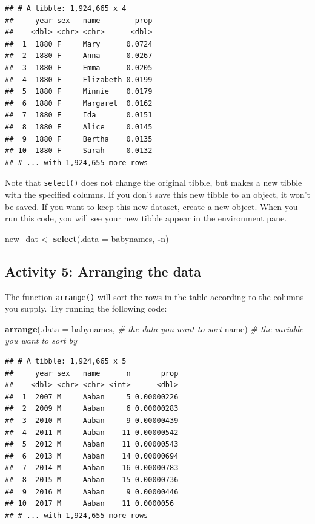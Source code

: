 \documentclass[]{book}
\newenvironment{Shaded}{\begin{snugshade}}{\end{snugshade}}
\newcommand{\CommentTok}[1]{\textcolor[rgb]{0.56,0.35,0.01}{\textit{#1}}}
\newcommand{\DataTypeTok}[1]{\textcolor[rgb]{0.13,0.29,0.53}{#1}}
\newcommand{\KeywordTok}[1]{\textcolor[rgb]{0.13,0.29,0.53}{\textbf{#1}}}
\newcommand{\NormalTok}[1]{#1}
\newcommand{\OperatorTok}[1]{\textcolor[rgb]{0.81,0.36,0.00}{\textbf{#1}}}
\newcommand{\StringTok}[1]{\textcolor[rgb]{0.31,0.60,0.02}{#1}}
\begin{document}
\begin{verbatim}
## # A tibble: 1,924,665 x 4
##     year sex   name        prop
##    <dbl> <chr> <chr>      <dbl>
##  1  1880 F     Mary      0.0724
##  2  1880 F     Anna      0.0267
##  3  1880 F     Emma      0.0205
##  4  1880 F     Elizabeth 0.0199
##  5  1880 F     Minnie    0.0179
##  6  1880 F     Margaret  0.0162
##  7  1880 F     Ida       0.0151
##  8  1880 F     Alice     0.0145
##  9  1880 F     Bertha    0.0135
## 10  1880 F     Sarah     0.0132
## # ... with 1,924,655 more rows
\end{verbatim}

Note that \texttt{select()} does not change the original tibble, but makes a new tibble with the specified columns. If you don't save this new tibble to an object, it won't be saved. If you want to keep this new dataset, create a new object. When you run this code, you will see your new tibble appear in the environment pane.

\begin{Shaded}
\begin{Highlighting}[]
\NormalTok{new_dat <-}\StringTok{ }\KeywordTok{select}\NormalTok{(}\DataTypeTok{.data =}\NormalTok{ babynames, }\OperatorTok{-}\NormalTok{n)}
\end{Highlighting}
\end{Shaded}

\hypertarget{activity-5-arranging-the-data}{%
\subsection{Activity 5: Arranging the data}\label{activity-5-arranging-the-data}}

The function \texttt{arrange()} will sort the rows in the table according to the columns you supply. Try running the following code:

\begin{Shaded}
\begin{Highlighting}[]
\KeywordTok{arrange}\NormalTok{(}\DataTypeTok{.data =}\NormalTok{ babynames, }\CommentTok{# the data you want to sort}
\NormalTok{        name) }\CommentTok{# the variable you want to sort by}
\end{Highlighting}
\end{Shaded}

\begin{verbatim}
## # A tibble: 1,924,665 x 5
##     year sex   name      n       prop
##    <dbl> <chr> <chr> <int>      <dbl>
##  1  2007 M     Aaban     5 0.00000226
##  2  2009 M     Aaban     6 0.00000283
##  3  2010 M     Aaban     9 0.00000439
##  4  2011 M     Aaban    11 0.00000542
##  5  2012 M     Aaban    11 0.00000543
##  6  2013 M     Aaban    14 0.00000694
##  7  2014 M     Aaban    16 0.00000783
##  8  2015 M     Aaban    15 0.00000736
##  9  2016 M     Aaban     9 0.00000446
## 10  2017 M     Aaban    11 0.0000056 
## # ... with 1,924,655 more rows
\end{verbatim}
\end{document}
